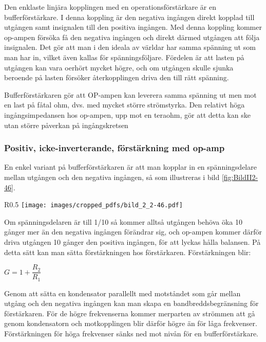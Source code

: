 Den enklaste linjära kopplingen med en operationsförstärkare är en
bufferförstärkare.
I denna koppling är den negativa ingången direkt kopplad till utgången
samt insignalen till den positiva ingången.
Med denna koppling kommer op-ampen försöka få den negativa ingången och direkt
därmed utgången att följa insignalen.
Det gör att man i den ideala av världar har samma spänning ut som man har in,
vilket även kallas för spänningsföljare.
Fördelen är att lasten på utgången kan vara oerhört mycket högre, och
om utgången skulle sjunka beroende på lasten försöker återkopplingen driva den
till rätt spänning.

Bufferförstärkaren gör att OP-ampen kan leverera samma spänning ut men mot en
last på fåtal ohm, dvs. med mycket större strömstyrka.
Den relativt höga ingångsimpedansen hos op-ampen, upp mot en teraohm, gör att detta
kan ske utan större påverkan på ingångskretsen 

\subsubsection{Positiv, icke-inverterande, förstärkning med op-amp}
\label{icke-inverterande förstärkning}

En enkel variant på bufferförstärkaren är att man kopplar in en spänningsdelare
mellan utgången och den negativa ingången, så som illustreras i bild
\ref{fig:BildII2-46}.

\begin{wrapfigure}{R}{0.5\textwidth}
	\texttt{[image: images/cropped\_pdfs/bild\_2\_2-46.pdf]}
	\caption{Icke-inverterande förstärkare}
	\label{fig:BildII2-46}
\end{wrapfigure}

Om spänningsdelaren är till 1/10 så kommer alltså utgången behöva öka 10 gånger
mer än den negativa ingången förändrar sig, och op-ampen kommer därför driva
utgången 10 gånger den positiva ingången, för att lyckas hålla balansen.
På detta sätt kan man sätta förstärkningen hos förstärkaren.
Förstärkningen blir:

\(G = 1+ \dfrac{R_2}{R_1}\)

Genom att sätta en kondensator parallellt med motståndet som går mellan utgång
och den negativa ingången kan man skapa en bandbreddsbegränsning för
förstärkaren.
För de högre frekvenserna kommer merparten av strömmen att gå genom
kondensatorn och motkopplingen blir därför högre än för låga frekvenser.
Förstärkningen för höga frekvenser sänks ned mot nivån för en bufferförstärkare.

